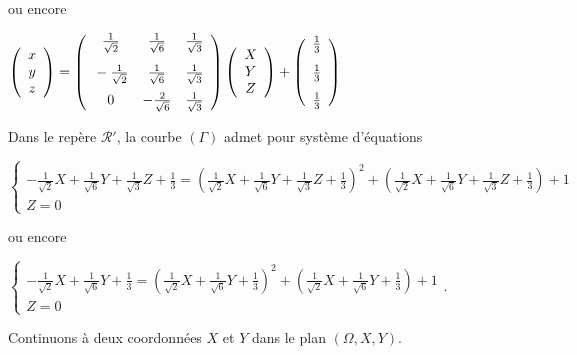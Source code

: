 {{ou encore

\begin{center}
$\left(
\begin{array}{c}
x\\
y\\
z
\end{array}
\right)=\left(
\begin{array}{ccc}
\frac{1}{\sqrt{2}}&\frac{1}{\sqrt{6}}&\frac{1}{\sqrt{3}}\\
\rule[-4mm]{0mm}{10mm}-\frac{1}{\sqrt{2}}&\frac{1}{\sqrt{6}}&\frac{1}{\sqrt{3}}\\
0&-\frac{2}{\sqrt{6}}&\frac{1}{\sqrt{3}}
\end{array}
\right)\left(
\begin{array}{c}
X\\
Y\\
Z
\end{array}
\right)+\left(
\begin{array}{c}
\frac{1}{3}\\
\rule[-4mm]{0mm}{10mm}\frac{1}{3}\\
\frac{1}{3}
\end{array}
\right)$
\end{center}

Dans le repère $\mathcal{R}'$, la courbe $(\Gamma)$ admet pour système d'équations 

\begin{center}
$\left\{
\begin{array}{l}
-\frac{1}{\sqrt{2}}X+\frac{1}{\sqrt{6}}Y+\frac{1}{\sqrt{3}}Z+\frac{1}{3}=\left(\frac{1}{\sqrt{2}}X+\frac{1}{\sqrt{6}}Y+\frac{1}{\sqrt{3}}Z+\frac{1}{3}\right)^2 +\left(\frac{1}{\sqrt{2}}X+\frac{1}{\sqrt{6}}Y+\frac{1}{\sqrt{3}}Z+\frac{1}{3}\right)+ 1\\
Z=0
\end{array}
\right.$
\end{center}

ou encore

\begin{center}
$\left\{
\begin{array}{l}
-\frac{1}{\sqrt{2}}X+\frac{1}{\sqrt{6}}Y+\frac{1}{3}=\left(\frac{1}{\sqrt{2}}X+\frac{1}{\sqrt{6}}Y+\frac{1}{3}\right)^2 +\left(\frac{1}{\sqrt{2}}X+\frac{1}{\sqrt{6}}Y+\frac{1}{3}\right)+ 1\\
Z=0
\end{array}
\right.$.
\end{center}

Continuons à deux coordonnées $X$ et $Y$ dans le plan $(\Omega,X,Y)$.

}}
